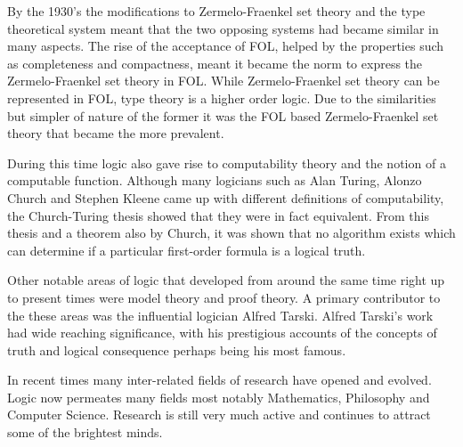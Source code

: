 By the 1930's the modifications to Zermelo-Fraenkel set theory and the type theoretical system meant that the two opposing systems had became similar in many aspects. The rise of the acceptance of FOL, helped by the properties such as completeness and compactness, meant it became the norm to express the Zermelo-Fraenkel set theory in FOL. While Zermelo-Fraenkel set theory can be represented in FOL, type theory is a higher order logic. Due to the similarities but simpler of nature of the former it was the FOL based Zermelo-Fraenkel set theory that became the more prevalent.\cite[p.~478]{Ferreiros01}

During this time logic also gave rise to computability theory and the notion of a computable function. Although many logicians such as Alan Turing, Alonzo Church and Stephen Kleene came up with different definitions of computability, the Church-Turing thesis showed that they were in fact equivalent. From this thesis and a theorem also by Church, it was shown that no algorithm exists which can determine if a particular first-order formula is a logical truth.

Other notable areas of logic that developed from around the same time right up to present times were model theory and proof theory. A primary contributor to the these areas was the influential logician Alfred Tarski. Alfred Tarski's work had wide reaching significance, with his prestigious accounts of the concepts of truth and logical consequence perhaps being his most famous.

In recent times many inter-related fields of research have opened and evolved. Logic now permeates many fields most notably Mathematics, Philosophy and Computer Science. Research is still very much active and continues to attract some of the brightest minds.


